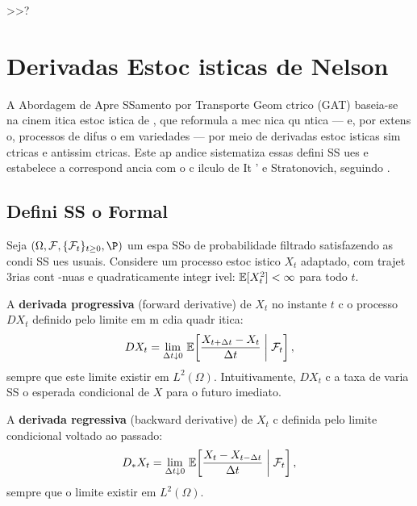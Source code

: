  >>?\chapter{Derivadas Estoc isticas de Nelson}
\label{apx:nelson}

A Abordagem de Apre SSamento por Transporte Geom ctrico (GAT) baseia-se na cinem itica estoc istica de , que reformula a mec nica qu ntica --- e, por extens o, processos de difus o em variedades --- por meio de derivadas estoc isticas sim ctricas e antissim ctricas. Este ap andice sistematiza essas defini SS ues e estabelece a correspond ancia com o c ilculo de It ' e Stratonovich, seguindo .

\section{Defini SS o Formal}
\label{sec:nelson_definicao}

Seja $(\Omega,\mathcal{F},\{\mathcal{F}_t\}_{t\geq 0},\P)$ um espa SSo de probabilidade filtrado satisfazendo as condi SS ues usuais. Considere um processo estoc istico $X_t$ adaptado, com trajet 3rias cont -nuas e quadraticamente integr ivel: $\mathbb{E}[X_t^2]<\infty$ para todo $t$.

\begin{defi}
A \textbf{derivada progressiva} (forward derivative) de $X_t$ no instante $t$ c o processo $DX_t$ definido pelo limite em m cdia quadr itica:
\begin{equation}
 DX_t = \lim_{\Delta t\downarrow 0}\,\mathbb{E}\!\left[\frac{X_{t+\Delta t} - X_t}{\Delta t}\;\middle|\;\mathcal{F}_t\right],
\end{equation}
sempre que este limite existir em $L^2(\Omega)$. Intuitivamente, $DX_t$ c a taxa de varia SS o esperada condicional de $X$ para o futuro imediato.
\end{defi}

\begin{defi}
A \textbf{derivada regressiva} (backward derivative) de $X_t$ c definida pelo limite condicional voltado ao passado:
\begin{equation}
 D_*X_t = \lim_{\Delta t\downarrow 0}\,\mathbb{E}\!\left[\frac{X_t - X_{t-\Delta t}}{\Delta t}\;\middle|\;\mathcal{F}_t\right],
\end{equation}
sempre que o limite existir em $L^2(\Omega)$.
\end{defi}

